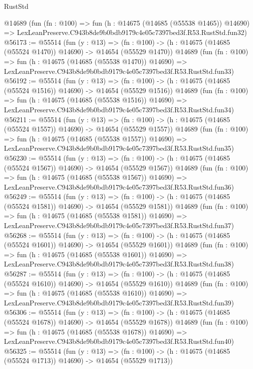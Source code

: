 \begin{lexlean}{RustStd}
\begin{coremodule}
    @14689
    (fun (fn : @100) =>
    fun (h : @14675 (@14685 (@55538 @1465)) @14690) =>
    LexLeanPreserve.C943b8de9b0bdb9179c4e05c7397bed3f.R53.RustStd.fun32)
@56173 := @55514
    (fun (y : @13) =>
    (fn : @100) -> (h : @14675 (@14685 (@55524 @1470)) @14690) -> @14654 (@55529 @1470))
    @14689
    (fun (fn : @100) =>
    fun (h : @14675 (@14685 (@55538 @1470)) @14690) =>
    LexLeanPreserve.C943b8de9b0bdb9179c4e05c7397bed3f.R53.RustStd.fun33)
@56192 := @55514
    (fun (y : @13) =>
    (fn : @100) -> (h : @14675 (@14685 (@55524 @1516)) @14690) -> @14654 (@55529 @1516))
    @14689
    (fun (fn : @100) =>
    fun (h : @14675 (@14685 (@55538 @1516)) @14690) =>
    LexLeanPreserve.C943b8de9b0bdb9179c4e05c7397bed3f.R53.RustStd.fun34)
@56211 := @55514
    (fun (y : @13) =>
    (fn : @100) -> (h : @14675 (@14685 (@55524 @1557)) @14690) -> @14654 (@55529 @1557))
    @14689
    (fun (fn : @100) =>
    fun (h : @14675 (@14685 (@55538 @1557)) @14690) =>
    LexLeanPreserve.C943b8de9b0bdb9179c4e05c7397bed3f.R53.RustStd.fun35)
@56230 := @55514
    (fun (y : @13) =>
    (fn : @100) -> (h : @14675 (@14685 (@55524 @1567)) @14690) -> @14654 (@55529 @1567))
    @14689
    (fun (fn : @100) =>
    fun (h : @14675 (@14685 (@55538 @1567)) @14690) =>
    LexLeanPreserve.C943b8de9b0bdb9179c4e05c7397bed3f.R53.RustStd.fun36)
@56249 := @55514
    (fun (y : @13) =>
    (fn : @100) -> (h : @14675 (@14685 (@55524 @1581)) @14690) -> @14654 (@55529 @1581))
    @14689
    (fun (fn : @100) =>
    fun (h : @14675 (@14685 (@55538 @1581)) @14690) =>
    LexLeanPreserve.C943b8de9b0bdb9179c4e05c7397bed3f.R53.RustStd.fun37)
@56268 := @55514
    (fun (y : @13) =>
    (fn : @100) -> (h : @14675 (@14685 (@55524 @1601)) @14690) -> @14654 (@55529 @1601))
    @14689
    (fun (fn : @100) =>
    fun (h : @14675 (@14685 (@55538 @1601)) @14690) =>
    LexLeanPreserve.C943b8de9b0bdb9179c4e05c7397bed3f.R53.RustStd.fun38)
@56287 := @55514
    (fun (y : @13) =>
    (fn : @100) -> (h : @14675 (@14685 (@55524 @1610)) @14690) -> @14654 (@55529 @1610))
    @14689
    (fun (fn : @100) =>
    fun (h : @14675 (@14685 (@55538 @1610)) @14690) =>
    LexLeanPreserve.C943b8de9b0bdb9179c4e05c7397bed3f.R53.RustStd.fun39)
@56306 := @55514
    (fun (y : @13) =>
    (fn : @100) -> (h : @14675 (@14685 (@55524 @1678)) @14690) -> @14654 (@55529 @1678))
    @14689
    (fun (fn : @100) =>
    fun (h : @14675 (@14685 (@55538 @1678)) @14690) =>
    LexLeanPreserve.C943b8de9b0bdb9179c4e05c7397bed3f.R53.RustStd.fun40)
@56325 := @55514
    (fun (y : @13) =>
    (fn : @100) -> (h : @14675 (@14685 (@55524 @1713)) @14690) -> @14654 (@55529 @1713))

\end{coremodule}
\end{lexlean}
